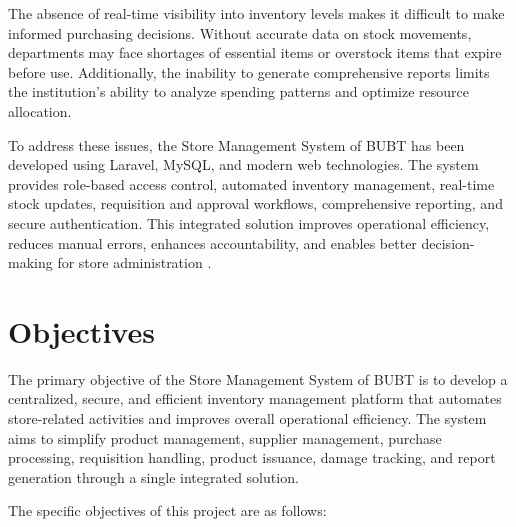 The absence of real-time visibility into inventory levels makes it difficult to make informed purchasing decisions. Without accurate data on stock movements, departments may face shortages of essential items or overstock items that expire before use. Additionally, the inability to generate comprehensive reports limits the institution's ability to analyze spending patterns and optimize resource allocation.

To address these issues, the Store Management System of BUBT has been developed using Laravel, MySQL, and modern web technologies. The system provides role-based access control, automated inventory management, real-time stock updates, requisition and approval workflows, comprehensive reporting, and secure authentication. This integrated solution improves operational efficiency, reduces manual errors, enhances accountability, and enables better decision-making for store administration \cite{laboratory_inventory}.

\section{Objectives}

The primary objective of the Store Management System of BUBT is to develop a centralized, secure, and efficient inventory management platform that automates store-related activities and improves overall operational efficiency. The system aims to simplify product management, supplier management, purchase processing, requisition handling, product issuance, damage tracking, and report generation through a single integrated solution.

The specific objectives of this project are as follows:

